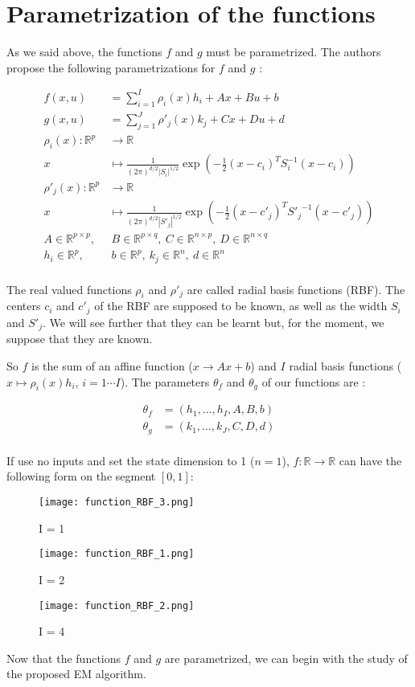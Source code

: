 
\section{Parametrization of the functions}

As we said above, the functions $f$ and $g$ must be parametrized.
The authors propose the following parametrizations for $f$ and $g$ :

\begin{align*}
  f(x,u) &= \sum_{i=1}^I \rho_i(x) h_i + Ax + Bu + b\\
  g(x,u) &= \sum_{j=1}^J \rho'_j(x) k_j + Cx + Du + d\\
  \rho_i(x) \colon \mathbb{R}^p &\to \mathbb{R}\\
  x &\mapsto \frac{1}{(2\pi)^{d/2}|S_i|^{1/2}} \exp \left(-\frac{1}{2}(x-c_i)^T S_{i}^{-1}(x-c_i)\right)\\
  \rho'_j(x) \colon \mathbb{R}^p &\to \mathbb{R}\\
  x &\mapsto \frac{1}{(2\pi)^{d/2}|S'_j|^{1/2}} \exp \left(-\frac{1}{2}(x-c'_j)^T {S'_{j}}^{-1}(x-c'_j)\right)\\
  A \in \mathbb{R}^{p \times p}, & \  B \in \mathbb{R}^{p \times q}, \  C \in \mathbb{R}^{n \times p}, \  D \in \mathbb{R}^{n \times q}\\
  h_i \in \mathbb{R}^{p},& \  b \in \mathbb{R}^p, \  k_j \in \mathbb{R}^{n},\   d \in \mathbb{R}^n\\
\end{align*}

The real valued functions $\rho_i$ and $\rho'_j$ are called radial basis functions (RBF).
The centers $c_i$ and $c'_j$ of the RBF are supposed to be known, as well as the width $S_i$ and $S'_j$.
We will see further that they can be learnt but, for the moment, we suppose that they are known.


So $f$ is the sum of an affine function ($x \rightarrow Ax + b$) and $I$ radial basis functions ($x \mapsto \rho_i(x) h_i$, $i=1 \cdots I$).
The parameters $\theta_f$ and $\theta_g$ of our functions are :

\begin{align*}
  \theta_f &= \left( h_1, \ldots , h_I, A, B, b\right) \\
  \theta_g &= \left( k_1, \ldots , k_J, C, D, d\right) \\
\end{align*}

If use no inputs and set the state dimension to 1 ($n = 1$), $f : \mathbb{R} \to \mathbb{R}$ can have the following form on the segment $\left [ 0 , 1 \right ]$:

\begin{figure}[H]
\captionsetup{labelformat=empty}
  \texttt{[image: function\_RBF\_3.png]}
  \caption{I = 1}
\endminipage\hfill
{}
  \texttt{[image: function\_RBF\_1.png]}
  \caption{I = 2}
\endminipage\hfill
{}
  \texttt{[image: function\_RBF\_2.png]}
  \caption{I = 4}
\endminipage\hfill
\end{figure}

Now that the functions $f$ and $g$ are parametrized, we can begin with the study of the proposed EM algorithm.
